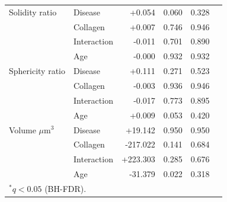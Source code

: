 \documentclass[11pt,a4paper]{article}
\begin{document}
\begin{longtable}{llrrrr}
  Solidity ratio & Disease & +0.054 & 0.060 & 0.328 &  \\
   & Collagen & +0.007 & 0.746 & 0.946 &  \\
   & Interaction & -0.011 & 0.701 & 0.890 &  \\
   & Age & -0.000 & 0.932 & 0.932 &  \\
  Sphericity ratio & Disease & +0.111 & 0.271 & 0.523 &  \\
   & Collagen & -0.003 & 0.936 & 0.946 &  \\
   & Interaction & -0.017 & 0.773 & 0.895 &  \\
   & Age & +0.009 & 0.053 & 0.420 &  \\
  Volume $\mu$m$^{3}$ & Disease & +19.142 & 0.950 & 0.950 &  \\
   & Collagen & -217.022 & 0.141 & 0.684 &  \\
   & Interaction & +223.303 & 0.285 & 0.676 &  \\
   & Age & -31.379 & 0.022 & 0.318 &  \\
\bottomrule
\multicolumn{6}{l}{\footnotesize $^{*}q < 0.05$ (BH-FDR).} \\
\end{longtable}
\end{document}
